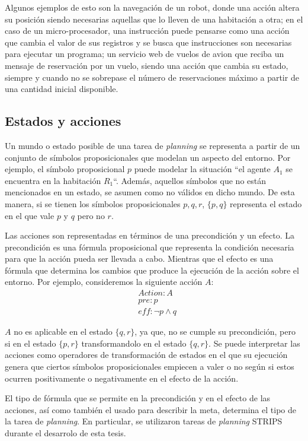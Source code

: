Algunos ejemplos de esto son la navegación de un robot, donde una acción altera
su posición siendo necesarias aquellas que lo lleven de una habitación a otra;
en el caso de un micro-procesador, una instrucción puede pensarse como una
acción que cambia el valor de sus registros y se busca que instrucciones son
necesarias para ejecutar un programa; un servicio web de vuelos de avion que
reciba un mensaje de reservación por un vuelo, siendo una acción que cambia su
estado, siempre y cuando no se sobrepase el número de reservaciones máximo a
partir de una cantidad inicial disponible. \citep{Sandewall-2008-HandbookOK}

\subsection{Estados y acciones}

Un mundo o estado  posible de una tarea de \emph{planning} se representa a
partir de un conjunto de símbolos proposicionales que modelan un aspecto del
entorno. Por ejemplo, el símbolo proposicional $p$ puede modelar la situación
``el agente $A_1$ se encuentra en la habitación $R_1$``. Además, aquellos
símbolos  que no están mencionados en un estado, se asumen como no válidos en
dicho mundo. De esta manera, si se tienen los símbolos proposicionales $p,q,r$,
$\{p, q\}$ representa el estado en el que vale $p$ y $q$ pero no $r$.

Las acciones son representadas en términos de una precondición y un efecto. La
precondición es una fórmula proposicional que representa la condición necesaria
para que la acción pueda ser llevada a cabo. Mientras que el efecto es una
fórmula que determina los cambios que produce la ejecución de la acción sobre el
entorno. Por ejemplo, consideremos la siguiente acción $A$:
\begin{align*}
    & Action : A \\
    & pre : p \\
    & eff : \neg p \land q
\end{align*}

$A$ no es aplicable en el estado $\{q, r\}$, ya que, no se cumple su
precondición, pero si en el estado $\{p, r\}$ transformandolo en el estado $\{q,
r\}$. Se puede interpretar las acciones como operadores de transformación de
estados en el que su ejecución genera que ciertos símbolos proposicionales
empiecen a valer o no según si estos ocurren positivamente o negativamente en el
efecto de la acción.

El tipo de fórmula que se permite en la precondición y en el efecto de las
acciones, así como también el usado para describir la meta, determina el tipo de
la tarea de \emph{planning}. En particular, se utilizaron tareas de
\emph{planning} STRIPS durante el desarrolo de esta tesis.

